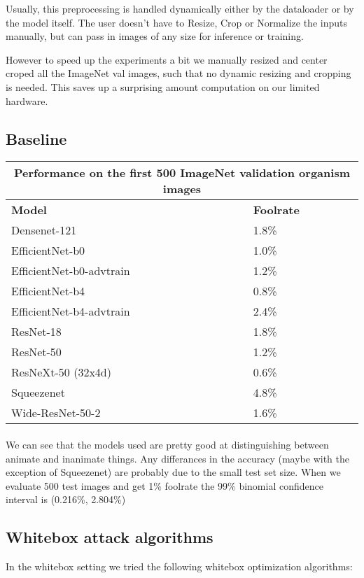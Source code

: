 Usually, this preprocessing is handled dynamically either by the dataloader or by the model itself. The user doesn't have to Resize, Crop or Normalize the inputs manually, but can pass in images of any size for inference or training.

However to speed up the experiments a bit we manually resized and center croped all the ImageNet val images, such that no dynamic resizing and cropping is needed. This saves up a surprising amount computation on our limited hardware.


\subsection{Baseline}
\begin{tabular}{ ||p{5cm}|p{3cm}|| }
  \hline
     \multicolumn{2}{|c|}{Performance on the first 500 ImageNet validation organism images} \\
 \hline
 \textbf{Model} & \textbf{Foolrate} \\
 \hline
 \hline
 Densenet-121 & 1.8\%  \\
 \hline
 EfficientNet-b0 & 1.0\% \\
 \hline
 EfficientNet-b0-advtrain & 1.2\% \\
 \hline
 EfficientNet-b4 & 0.8\% \\
 \hline
 EfficientNet-b4-advtrain & 2.4\% \\
 \hline
 ResNet-18 & 1.8\% \\
 \hline
 ResNet-50 & 1.2\% \\
 \hline
 ResNeXt-50 (32x4d) & 0.6\% \\
 \hline
 Squeezenet & 4.8\% \\
 \hline
 Wide-ResNet-50-2 & 1.6\% \\
 \hline
\end{tabular}

\paragraph{}
We can see that the models used are pretty good at distinguishing between animate and inanimate things. Any differances in the accuracy (maybe with the exception of Squeezenet) are probably due to the small test set size. When we evaluate 500 test images and get 1\% foolrate the 99\% binomial confidence interval is (0.216\%, 2.804\%)

\subsection{Whitebox attack algorithms}
In the whitebox setting we tried the following whitebox optimization algorithms:

